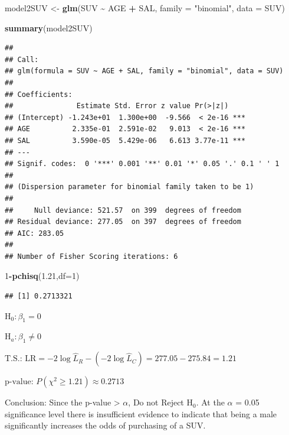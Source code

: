 \documentclass[
]{article}
\newenvironment{Shaded}{\begin{snugshade}}{\end{snugshade}}
\newcommand{\AttributeTok}[1]{\textcolor[rgb]{0.13,0.29,0.53}{#1}}
\newcommand{\DecValTok}[1]{\textcolor[rgb]{0.00,0.00,0.81}{#1}}
\newcommand{\FloatTok}[1]{\textcolor[rgb]{0.00,0.00,0.81}{#1}}
\newcommand{\FunctionTok}[1]{\textcolor[rgb]{0.13,0.29,0.53}{\textbf{#1}}}
\newcommand{\NormalTok}[1]{#1}
\newcommand{\OtherTok}[1]{\textcolor[rgb]{0.56,0.35,0.01}{#1}}
\newcommand{\SpecialCharTok}[1]{\textcolor[rgb]{0.81,0.36,0.00}{\textbf{#1}}}
\newcommand{\StringTok}[1]{\textcolor[rgb]{0.31,0.60,0.02}{#1}}
\begin{document}
\begin{Shaded}
\begin{Highlighting}[]
\NormalTok{model2SUV }\OtherTok{\textless{}{-}} \FunctionTok{glm}\NormalTok{(SUV }\SpecialCharTok{\textasciitilde{}}\NormalTok{ AGE }\SpecialCharTok{+}\NormalTok{ SAL, }\AttributeTok{family =} \StringTok{"binomial"}\NormalTok{, }\AttributeTok{data =}\NormalTok{ SUV)}

\FunctionTok{summary}\NormalTok{(model2SUV)}
\end{Highlighting}
\end{Shaded}

\begin{verbatim}
## 
## Call:
## glm(formula = SUV ~ AGE + SAL, family = "binomial", data = SUV)
## 
## Coefficients:
##               Estimate Std. Error z value Pr(>|z|)    
## (Intercept) -1.243e+01  1.300e+00  -9.566  < 2e-16 ***
## AGE          2.335e-01  2.591e-02   9.013  < 2e-16 ***
## SAL          3.590e-05  5.429e-06   6.613 3.77e-11 ***
## ---
## Signif. codes:  0 '***' 0.001 '**' 0.01 '*' 0.05 '.' 0.1 ' ' 1
## 
## (Dispersion parameter for binomial family taken to be 1)
## 
##     Null deviance: 521.57  on 399  degrees of freedom
## Residual deviance: 277.05  on 397  degrees of freedom
## AIC: 283.05
## 
## Number of Fisher Scoring iterations: 6
\end{verbatim}

\begin{Shaded}
\begin{Highlighting}[]
\DecValTok{1}\SpecialCharTok{{-}}\FunctionTok{pchisq}\NormalTok{(}\FloatTok{1.21}\NormalTok{,}\AttributeTok{df=}\DecValTok{1}\NormalTok{)}
\end{Highlighting}
\end{Shaded}

\begin{verbatim}
## [1] 0.2713321
\end{verbatim}

\(\text{H}_{0}: \beta_{1} = 0\)

\(\text{H}_{a}: \beta_{1} \ne 0\)

\(\text{T.S.: } \text{LR}=-2\log {{\hat{L}}_{R}}-\left( -2\log {{{\hat{L}}}_{C}} \right)=277.05-275.84=1.21\)

\(\text{p-value: } P(\chi^2 \ge 1.21) \approx 0.2713\)

Conclusion: Since the p-value \textgreater{} \(\alpha\), Do not Reject
\(\text{H}_{0}\). At the \(\alpha\) = 0.05 significance level there is
insufficient evidence to indicate that being a male significantly
increases the odds of purchasing of a SUV.
\end{document}
